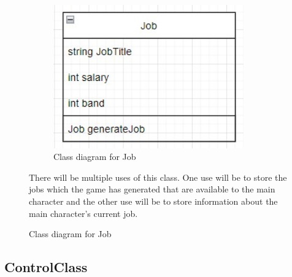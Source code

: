 \begin{figure} [H]
    \centering
    \begin{minipage}{0.45\textwidth}
        \begin{figure}[H]
        \centering
        \includegraphics[width=0.9\textwidth]{images/design/class-job.jpg}
        \caption{Class diagram for Job}
        \label{fig:design-class-job}
        \end{figure}
    \end{minipage} \hfill
    \begin{minipage}{0.45\textwidth}
        There will be multiple uses of this class. One use will be to store the jobs which the game has generated that are available to the main character and the other use will be to store information about the main character's current job.
    \end{minipage}
\end{figure}

\subsection{ControlClass}

